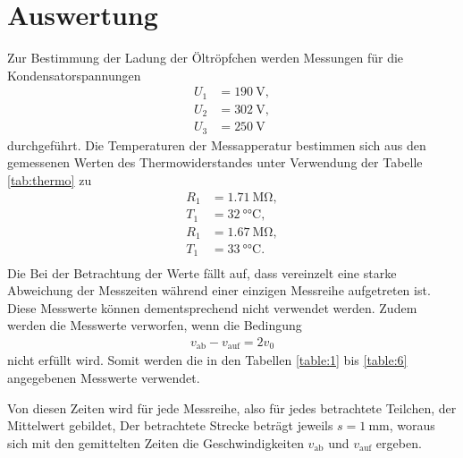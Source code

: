 \section{Auswertung}
\label{sec:Auswertung}

Zur Bestimmung der Ladung der Öltröpfchen werden Messungen für die Kondensatorspannungen
\begin{align*}
U_1 &= \SI{190}{\volt},\\
U_2 &= \SI{302}{\volt},\\
U_3 &= \SI{250}{\volt}
\end{align*}
durchgeführt.
Die Temperaturen der Messapperatur bestimmen sich aus den gemessenen Werten des Thermowiderstandes unter Verwendung der Tabelle \ref{tab:thermo} zu
\begin{align*}
R_1 &= \SI{1.71}{\mega\ohm},\\
T_1 &= \SI{32}{\degree\celsius},\\
R_1 &= \SI{1.67}{\mega\ohm},\\
T_1 &= \SI{33}{\degree\celsius}.\\
\end{align*}
Die
Bei der Betrachtung der Werte fällt auf, dass vereinzelt eine starke Abweichung der Messzeiten während einer einzigen Messreihe aufgetreten ist.
Diese Messwerte können dementsprechend nicht verwendet werden.
Zudem werden die Messwerte verworfen, wenn die Bedingung
\begin{align*}
  v_{\text{ab}} - v_{\text{auf}} = 2 v_0
\end{align*}
nicht erfüllt wird.
Somit werden die in den Tabellen \ref{table:1} bis \ref{table:6} angegebenen Messwerte verwendet.











Von diesen Zeiten wird für jede Messreihe, also für jedes betrachtete Teilchen, der Mittelwert gebildet,
Der betrachtete Strecke beträgt jeweils $s = \SI{1}{\milli\metre}$, woraus sich mit den gemittelten Zeiten die Geschwindigkeiten $v_{\text{ab}}$ und $v_{\text{auf}}$ ergeben.







